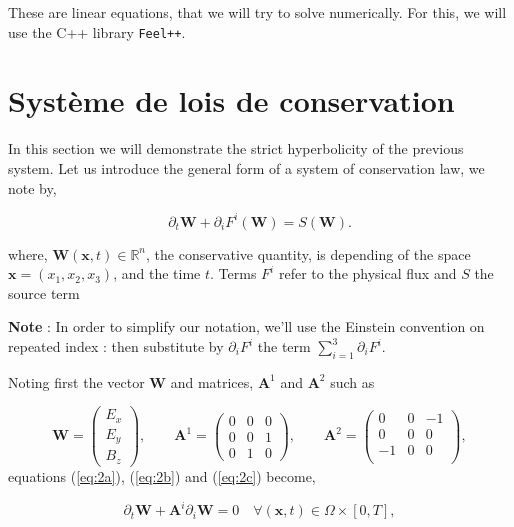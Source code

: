\documentclass[a4paper,oneside,10pt]{report}
\begin{document}
These are linear equations, that we will try to solve numerically. For this, we will use the C++ library \texttt{Feel++}. 


\section{Système de lois de conservation}
In this section we will demonstrate the strict hyperbolicity of the previous system. Let us introduce the general form of a system of conservation law, we note by,

\begin{equation}
\label{eq:sysh}
\partial_t \mathbf{W} +  \partial_i F^i(\mathbf{W}) = S(\mathbf{W}).
\end{equation}

where, $\mathbf{W}(\mathbf{x},t) \in \mathbb{R}^n$, the conservative quantity, is depending of the space $\mathbf{x} = (x_1,x_2,x_3)$, and the time $t$. Terms $F^i$ refer to the physical flux and $S$ the source term

\textbf{Note } : In order to simplify our notation, we'll use the Einstein convention on repeated index :  then substitute by $\partial_i F^i$ the term $\sum_{i=1}^{3}\partial _i F^i$.\newline


Noting first the vector $\mathbf{W}$ and matrices, $\mathbf{A}^1$ and $\mathbf{A}^2$ such as


\begin{equation}
\mathbf{W}=
\begin{pmatrix}
E_x\\
E_y\\
B_z
\end{pmatrix},
\qquad
\mathbf{A}^1=
\begin{pmatrix}
0 & 0 & 0\\
0 & 0 & 1\\
0 & 1 & 0
\end{pmatrix},
\qquad
\mathbf{A}^2=
\begin{pmatrix}
0 & 0 & -1\\
0 & 0 & 0\\
-1 & 0 & 0\\
\end{pmatrix},
\end{equation}
equations (\ref{eq:2a}), (\ref{eq:2b}) and (\ref{eq:2c}) become,

\begin{equation}
\label{eq:sysh2}
\partial_t \mathbf{W} +  \mathbf{A}^i\partial_i \mathbf{W} = 0 \quad \forall (\mathbf{x},t) \in \Omega \times [0,T],
\end{equation}
\end{document}

